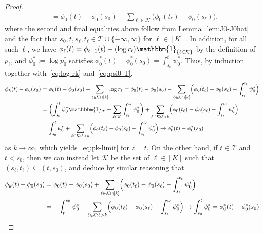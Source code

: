 \documentclass[10pt,a4paper]{amsart}
\newcommand{\Ind}{\mathbbm{1}}
\begin{document}
\begin{proof}
\begin{align}
\label{eq:psi0-T}
&= \phi_0(t) - \phi_0(s_0) - \sum_{\ell \in \mathcal{K}}\bigl(\phi_0(t_\ell) - \phi_0(s_\ell)\bigr),
\end{align}
where the second and final equalities above follow from Lemma~\ref{lem:J0-J0hat} and the fact that $s_0,t,s_\ell,t_\ell \in \mathcal{T} \cup \{-\infty,\infty\}$ for $\ell \in [K]$. In addition, for all such $\ell$, we have $\phi_\ell(t) = \phi_{\ell-1}(t) + (\log r_\ell)\Ind_{\{\ell \in \mathcal{K}\}}$ by the definition of $p_\ell$, and $\phi_0^* := \log p_0^*$ satisfies $\phi_0^*(t) - \phi_0^*(s_0) = \int_{s_0}^t \psi_0^*$. Thus, by induction together with~\eqref{eq:log-rk} and~\eqref{eq:psi0-T},
\begin{align*}
\phi_k(t) - \phi_0(s_0) &= \phi_0(t) - \phi_0(s_0) + \sum_{\ell \in \mathcal{K} \cap [k]}\log r_\ell = \phi_0(t) - \phi_0(s_0) - \sum_{\ell \in \mathcal{K} \cap [k]} \Bigl(\phi_0(t_\ell) - \phi_0(s_\ell) - \int_{s_\ell}^{t_\ell}\psi_0^*\Bigr) \\
&= \biggl(\int_{s_0}^t \psi_0^* \Ind_{\mathcal{T}} + \sum_{\ell \in \mathcal{K}} \int_{s_\ell}^{t_\ell} \psi_0^*\biggr) + \sum_{\ell \in \mathcal{K} : \ell > k} \Bigl(\phi_0(t_\ell) - \phi_0(s_\ell) - \int_{s_\ell}^{t_\ell}\psi_0^*\Bigr) \\
&= \int_{s_0}^t \psi_0^* + \sum_{\ell \in \mathcal{K} : \ell > k} \Bigl(\phi_0(t_\ell) - \phi_0(s_\ell) - \int_{s_\ell}^{t_\ell}\psi_0^*\Bigr) \to \phi_0^*(t) - \phi_0^*(s_0)
\end{align*}
as $k \to \infty$, which yields~\eqref{eq:pk-limit} for $z = t$. On the other hand, if $t \in \mathcal{T}$ and $t < s_0$, then we can instead let $\mathcal{K}$ be the set of $\ell \in [K]$ such that $(s_\ell,t_\ell) \subseteq (t,s_0)$, and deduce by similar reasoning that
\begin{align*}
\phi_k(t) - \phi_0(s_0) &= \phi_0(t) - \phi_0(s_0) + \sum_{\ell \in \mathcal{K} \cap [k]} \Bigl(\phi_0(t_\ell) - \phi_0(s_\ell) - \int_{s_\ell}^{t_\ell}\psi_0^*\Bigr) \\
&= -\int_t^{s_0}\psi_0^* - \sum_{\ell \in \mathcal{K} : \ell > k} \Bigl(\phi_0(t_\ell) - \phi_0(s_\ell) - \int_{s_\ell}^{t_\ell}\psi_0^*\Bigr) \to \int_{s_0}^t \psi_0^* = \phi_0^*(t) - \phi_0^*(s_0)

\end{align*}
\end{proof}
\end{document}
